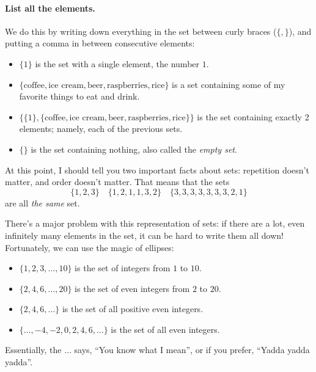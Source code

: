 \documentclass{tufte-book}
\begin{document}
\paragraph{List all the elements.}
\label{sec:list-all-elements}

We do this by writing down everything in the set between curly braces ($\{, \}$), and putting a comma in between consecutive elements:
\begin{itemize}
    \item $\{1\}$ is the set with a single element, the number $1$.
    \item $\{\text{coffee}, \text{ice cream}, \text{beer}, \text{raspberries}, \text{rice}\}$ is a set containing some of my favorite things to eat and drink.
    \item $\{\{1\}, \{\text{coffee}, \text{ice cream}, \text{beer}, \text{raspberries}, \text{rice}\}\}$ is the set containing exactly 2 elements; namely, each of the previous sets.
    \item $\{\}$ is the set containing nothing, also called the \emph{empty set}.
\end{itemize}
At this point, I should tell you two important facts about sets: repetition doesn't matter, and order doesn't matter. That means that the sets
\[
\{1, 2, 3\} \quad \{1, 2, 1, 1, 3, 2\} \quad \{3, 3, 3, 3, 3, 3, 3, 2, 1\}
\]
are all \emph{the same} set. 

There's a major problem with this representation of sets: if there are a lot, even infinitely many elements in the set, it can be hard to write them all down! Fortunately, we can use the magic of ellipses:
\begin{itemize}
    \item $\{1, 2, 3, \dots, 10\}$ is the set of integers from $1$ to $10$.
    \item $\{2, 4, 6, \dots, 20\}$ is the set of even integers from $2$ to $20$.
    \item $\{2, 4, 6, \dots\}$ is the set of all positive even integers.
    \item $\{\dots, -4, -2, 0, 2, 4, 6, \dots\}$ is the set of all even integers.
\end{itemize}
Essentially, the $\dots$ says, ``You know what I mean'', or if you prefer, ``Yadda yadda yadda''.
\end{document}
